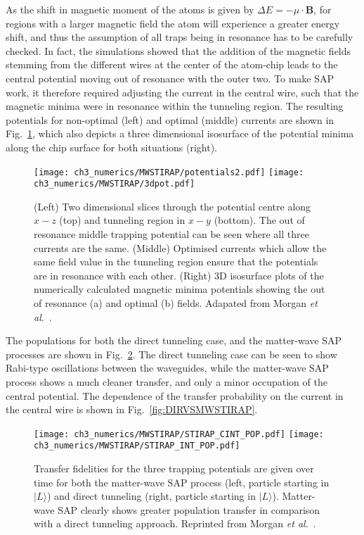 As the shift in magnetic moment of the atoms is given by $\Delta E = -\mu\cdot\mathbf{B}$, for regions with a larger magnetic field the atom will experience a greater energy shift, and thus the assumption of all traps being in resonance has to be carefully checked. In fact, the simulations showed that the addition of the magnetic fields stemming from the different wires at the center of the atom-chip leads to the central potential moving out of resonance with the outer two. To make SAP work, it therefore required adjusting the current in the central wire, such that the magnetic minima were in resonance within the tunneling region. The resulting potentials for non-optimal (left) and optimal (middle) currents are shown in Fig.~\ref{fig:equaloptcurrent}, which also depicts a three dimensional isosurface of the potential minima along the chip surface for both situations (right).

\begin{figure}[tb]
    \centering
  \texttt{[image: ch3\_numerics/MWSTIRAP/potentials2.pdf]}
  \texttt{[image: ch3\_numerics/MWSTIRAP/3dpot.pdf]}
  \caption{(Left) Two dimensional slices through the potential centre along $x-z$ (top) and tunneling region in $x-y$ (bottom). The out of resonance middle trapping potential can be seen where all three currents are the same. (Middle) Optimised currents which allow the same field value in the tunneling region ensure that the potentials are in resonance with each other. (Right) 3D isosurface plots of the numerically calculated magnetic minima potentials showing the out of resonance (a) and optimal (b) fields. Adapated from Morgan {\textit{et al}.}~\cite{AO:Morgan_pra_2013}.}
  \label{fig:equaloptcurrent}
\end{figure}
The populations for both the direct tunneling case, and the matter-wave SAP processes are shown in Fig.~\ref{fig:mwsVsDT}. The direct tunneling case can be seen to show Rabi-type oscillations between the waveguides, while the matter-wave SAP process shows a much cleaner transfer, and only a minor occupation of the central potential. The dependence of the transfer probability on the current in the central wire is shown in Fig.~\ref{fig:DIRVSMWSTIRAP}.


\begin{figure}[tb]
    \centering
  \texttt{[image: ch3\_numerics/MWSTIRAP/STIRAP\_CINT\_POP.pdf]}
  \texttt{[image: ch3\_numerics/MWSTIRAP/STIRAP\_INT\_POP.pdf]}
  \caption{Transfer fidelities for the three trapping potentials are given over time for both the matter-wave SAP process (left, particle starting in $ |L\rangle$) and direct tunneling (right, particle starting in $ |L\rangle$). Matter-wave SAP clearly shows greater population transfer in comparison with a direct tunneling approach. Reprinted from Morgan {\textit{et al}.}~\cite{AO:Morgan_pra_2013}.}
  \label{fig:mwsVsDT}
\end{figure}

